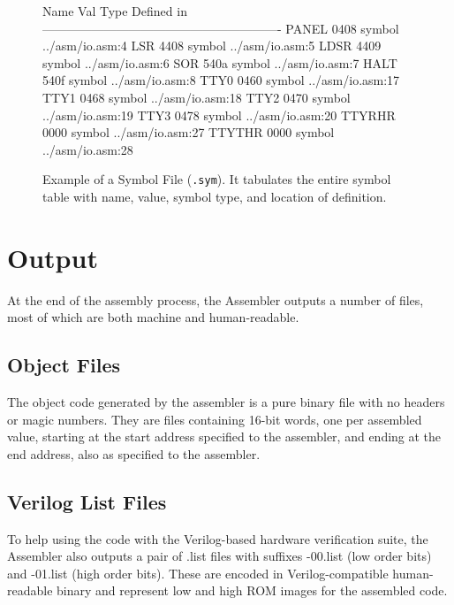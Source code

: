 \begin{figure}
\begin{intrcode}
Name                      Val   Type    Defined in
----------------------------------------------------------
PANEL                     0408  symbol  ../asm/io.asm:4
LSR                       4408  symbol  ../asm/io.asm:5
LDSR                      4409  symbol  ../asm/io.asm:6
SOR                       540a  symbol  ../asm/io.asm:7
HALT                      540f  symbol  ../asm/io.asm:8
TTY0                      0460  symbol  ../asm/io.asm:17
TTY1                      0468  symbol  ../asm/io.asm:18
TTY2                      0470  symbol  ../asm/io.asm:19
TTY3                      0478  symbol  ../asm/io.asm:20
TTYRHR                    0000  symbol  ../asm/io.asm:27
TTYTHR                    0000  symbol  ../asm/io.asm:28
\end{intrcode}
\caption[Symbol File Example]{\label{fig:sym-file} Example of a Symbol File
  (\texttt{.sym}). It tabulates the entire symbol table with name, value,
  symbol type, and location of definition.}
\end{figure}



\section{Output}

At the end of the assembly process, the Assembler outputs a number of files,
most of which are both machine and human-readable.

\subsection{Object Files}

The object code generated by the assembler is a pure binary file with no
headers or magic numbers. They are files containing 16-bit words, one per
assembled value, starting at the start address specified to the assembler, and
ending at the end address, also as specified to the assembler.

\subsection{Verilog List Files}

To help using the code with the Verilog-based hardware verification suite, the
Assembler also outputs a pair of {\ttfamily .list} files with suffixes {\ttfamily -00.list}
(low order bits) and {\ttfamily -01.list} (high order bits). These are encoded in
Verilog-compatible human-readable binary and represent low and high ROM images
for the assembled code.

